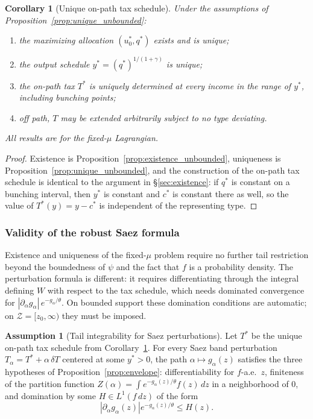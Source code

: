 \documentclass[12pt,a4paper]{article}
\theoremstyle{definition}
\newtheorem{assumption}{Assumption}[section]
\theoremstyle{plain}
\newtheorem{corollary}{Corollary}[section]
\theoremstyle{remark}
\newcommand{\zlow}{z_{\scriptscriptstyle 0}}
\newcommand{\calZ}{\mathcal{Z}}
\begin{document}
\begin{corollary}[Unique on-path tax schedule]
\label{cor:T_unique_unbounded}
Under the assumptions of Proposition~\ref{prop:unique_unbounded}:
\begin{enumerate}[label=(\roman*)]
\item the maximizing allocation $(u_0^*,q^*)$ exists and is unique;
\item the output schedule $y^* = (q^*)^{1/(1+\gamma)}$ is unique;
\item the on-path tax $T^*$ is uniquely determined at every income in
  the range of $y^*$, including bunching points;
\item off path, $T$ may be extended arbitrarily subject to no type
  deviating.
\end{enumerate}
All results are for the fixed-$\mu$ Lagrangian.
\end{corollary}

\begin{proof}
Existence is Proposition~\ref{prop:existence_unbounded},
uniqueness is Proposition~\ref{prop:unique_unbounded}, and
the construction of the on-path tax schedule is identical to
the argument in \S\ref{sec:existence}: if $q^*$ is constant
on a bunching interval, then $y^*$ is constant and $c^*$ is
constant there as well, so the value of $T^*(y) = y-c^*$ is
independent of the representing type.
\end{proof}


\subsubsection{Validity of the robust Saez formula}

Existence and uniqueness of the fixed-$\mu$ problem require no further
tail restriction beyond the boundedness of $\psi$ and the fact that
$f$ is a probability density.  The perturbation formula is different:
it requires differentiating through the integral defining $W$ with
respect to the tax schedule, which needs dominated convergence for
$|\partial_\alpha g_\alpha|\,e^{-g_\alpha/\theta}$.  On bounded
support these domination conditions are automatic; on
$\calZ = [\zlow,\infty)$ they must be imposed.

\begin{assumption}[Tail integrability for Saez perturbations]
\label{as:tail_formula_unbounded}
Let $T^*$ be the unique on-path tax schedule from
Corollary~\ref{cor:T_unique_unbounded}.  For every Saez band
perturbation $T_\alpha = T^* + \alpha\,\delta T$ centered at some
$y^* > 0$, the path $\alpha \mapsto g_\alpha(z)$ satisfies the three
hypotheses of Proposition~\ref{prop:envelope}: differentiability for
$f$-a.e.\ $z$, finiteness of the partition function
$Z(\alpha) = \int e^{-g_\alpha(z)/\theta} f(z)\,dz$ in a
neighborhood of $0$, and domination by some
$H \in L^1(f\,dz)$ of the form
\[
  |\partial_\alpha g_\alpha(z)| e^{-g_\alpha(z)/\theta} \leq H(z).
\]
\end{assumption}
\end{document}
